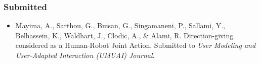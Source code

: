 \subsubsection*{Submitted}

\begin{itemize}
\item Mayima, A., Sarthou, G., Buisan, G., Singamaneni, P., Sallami, Y., Belhassein, K., Waldhart, J., Clodic, A., \& Alami, R. Direction-giving considered as a Human-Robot Joint Action. Submitted to \textit{User Modeling and User-Adapted Interaction (UMUAI) Journal}.
\end{itemize}